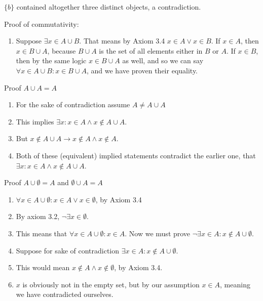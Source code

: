 \documentclass{article}
\begin{document}
\begin{enumerate}
\begin{enumerate}
                    $\{b\}$ contained altogether three distinct objects, a contradiction.
            \end{enumerate}
            Proof of commutativity:
            \begin{enumerate}
                \item Suppose $\exists x \in A \cup B$. That means by Axiom 3.4 
                    $x \in A \lor x \in B$. If $x \in A$, then $x \in B \cup
                    A$, because $B \cup A$ is the set of all elements either in
                    $B$ or $A$.  If $x \in B$, then by the same logic $x \in B
                    \cup A$ as well, and so we can say $\forall x \in A \cup B:
                    x \in B \cup A$, and we have proven their equality.
            \end{enumerate}
            Proof $A \cup A = A$
            \begin{enumerate}
                \item For the sake of contradiction assume $A \neq A \cup A$
                \item This implies $\exists x : x \in A \land x \notin A \cup A$.
                \item But $x \notin A \cup A \rightarrow x \notin A \land x \notin A$. 
                \item Both of these (equivalent) implied statements contradict the earlier
                    one, that $\exists x : x \in A \land x \notin A \cup A$.
            \end{enumerate}
            Proof $A \cup \emptyset = A$ and $\emptyset \cup A = A$
            \begin{enumerate}
                \item $\forall x \in A \cup \emptyset: x \in A \lor x \in \emptyset$, by Axiom 3.4
                \item By axiom 3.2, $\neg\exists x \in \emptyset$.
                \item This means that $\forall x \in A \cup \emptyset: x \in
                    A$. Now we must prove $\neg\exists x \in A : x \notin A \cup \emptyset$.
                \item Suppose for sake of contradiction $\exists x \in A : x \notin A \cup \emptyset$.
                \item This would mean $x \notin A \land x \notin \emptyset$, by Axiom 3.4.
                \item $x$ is obviously not in the empty set, but by our assumption $x \in A$,
                    meaning we have contradicted ourselves.

\end{enumerate}
\end{enumerate}
\end{document}
